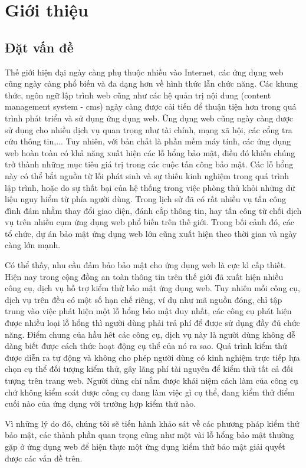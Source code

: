 \cleardoublepage
{}
\chapter{Giới thiệu}
\section{Đặt vấn đề}
Thế giới hiện đại ngày càng phụ thuộc nhiều vào Internet, các ứng dụng web cũng ngày càng phổ biến và đa dạng hơn về hình thức lẫn chức năng. Các khung thức, ngôn ngữ lập trình web cũng như các hệ quản trị nội dung (content management system - \acrshort{cms}) ngày càng được cải tiến để thuận tiện hơn trong quá trình phát triển và sử dụng ứng dụng web. Ứng dụng web cũng ngày càng được sử dụng cho nhiều dịch vụ quan trọng như tài chính, mạng xã hội, các cổng tra cứu thông tin,... Tuy nhiên, với bản chất là phần mềm máy tính, các ứng dụng web hoàn toàn có khả năng xuất hiện các lỗ hổng bảo mật, điều đó khiến chúng trở thành những mục tiêu giá trị trong các cuộc tấn công bảo mật. Các lỗ hổng này có thể bắt nguồn từ lỗi phát sinh và sự thiếu kinh nghiệm trong quá trình lập trình, hoặc do sự thất bại của hệ thống trong việc phòng thủ khỏi những dữ liệu nguy hiểm từ phía người dùng. Trong lịch sử đã có rất nhiều vụ tấn công đình đám nhằm thay đổi giao diện, đánh cắp thông tin, hay tấn công từ chối dịch vụ trên nhiều cụm ứng dụng web phổ biến trên thế giới. Trong bối cảnh đó, các tổ chức, dự án bảo mật ứng dụng web lớn cũng xuất hiện theo thời gian và ngày càng lớn mạnh.\par
Có thể thấy, nhu cầu đảm bảo bảo mật cho ứng dụng web là cực kì cấp thiết. Hiện nay trong cộng đồng an toàn thông tin trên thế giới đã xuất hiện nhiều công cụ, dịch vụ hỗ trợ kiểm thử bảo mật ứng dụng web. Tuy nhiên mỗi công cụ, dịch vụ trên đều có một số hạn chế riêng, ví dụ như mã nguồn đóng, chỉ tập trung vào việc phát hiện một lỗ hổng bảo mật duy nhất, các công cụ phát hiện được nhiều loại lỗ hổng thì người dùng phải trả phí để được sử dụng đầy đủ chức năng. Điểm chung của hầu hêt các công cụ, dịch vụ này là người dùng không dễ dàng biết được cách thức hoạt động cụ thể của nó ra sao. Quá trình kiểm thử được diễn ra tự động và không cho phép người dùng có kinh nghiệm trực tiếp lựa chọn cụ thể đối tượng kiểm thử, gây lãng phí tài nguyên để kiểm thử tất cả đối tượng trên trang web. Người dùng chỉ nắm được khái niệm cách làm của công cụ chứ không kiểm soát được công cụ đang làm việc gì cụ thể, đang kiểm thử điểm cuối nào của ứng dụng với trường hợp kiểm thử nào.\par
Vì những lý do đó, chúng tôi sẽ tiến hành khảo sát về các phương pháp kiểm thử bảo mật, các thành phần quan trọng cũng như một vài lỗ hổng bảo mật thường gặp ở ứng dụng web để hiện thực một ứng dụng kiểm thử bảo mật giải quyết được các vấn đề trên.

